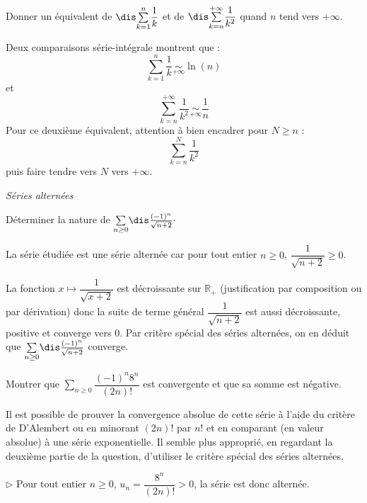 \documentclass[a4paper,10pt]{report}
\newcommand{\Sum}[2]{\ensuremath{\textstyle{\sum\limits_{#1}^{#2}}}}
\begin{document}
\begin{Exa}\label{harm} Donner un équivalent de $\dis \Sum{k=1}n \dfrac{1}{k}$ et de $\dis \Sum{k=n}{+ \infty} \dfrac{1}{k^2}$ quand $n$ tend vers $+ \infty$.
\end{Exa} 

\corr Deux comparaisons série-intégrale montrent que :
$$ \sum_{k=1}^n \dfrac{1}{k} \underset{+ \infty}{\sim} \ln(n) $$
et 
$$ \sum_{k=n}^{+ \infty} \dfrac{1}{k^2} \underset{+ \infty}{\sim} \dfrac{1}{n} $$
Pour ce deuxième équivalent, attention à bien encadrer pour $N \geq n$ :
$$ \sum_{k=n}^N \dfrac{1}{k^2}$$
puis faire tendre vers $N$ vers $+ \infty$.

\medskip

\begin{center}
\textit{{ {\large Séries alternées}}}
\end{center}

\medskip

\begin{Exa} Déterminer la nature de $\Sum{n \geq 0}{} \dis\frac{(-1)^n}{\sqrt{n+2}}\cdot$
\end{Exa}

\corr La série étudiée est une série alternée car pour tout entier $n \geq 0$, $\dfrac{1}{\sqrt{n+2}} \geq 0$.


\noindent La fonction $x \mapsto \dfrac{1}{\sqrt{x+2}}$ est décroissante sur $\mathbb{R}_+$ (justification par composition ou par dérivation) donc la suite de terme général $\dfrac{1}{\sqrt{n+2}}$ est aussi décroissante, positive et converge vers $0$. Par critère spécial des séries alternées, on en déduit que $\Sum{n \geq 0}{} \dis\frac{(-1)^n}{\sqrt{n+2}}$ converge.

\medskip

\begin{Exa} Montrer que $\Sum{n \geq 0}{} {\dfrac{( - 1)^n 8^n}{(2n)!}}$ est convergente et que sa somme est négative. \end{Exa}

\corr Il est possible de prouver la convergence absolue de cette série à l'aide du critère de D'Alembert ou en minorant $(2n)!$ par $n!$ et en comparant (en valeur absolue) à une série exponentielle. Il semble plus approprié, en regardant la deuxième partie de la question, d'utiliser le critère spécial des séries alternées.

\medskip

\noindent $\rhd$ Pour tout entier $n \geq 0$, $u_n = \dfrac{ 8^n}{(2n)!} > 0$, la série est donc alternée. 
\end{document}
